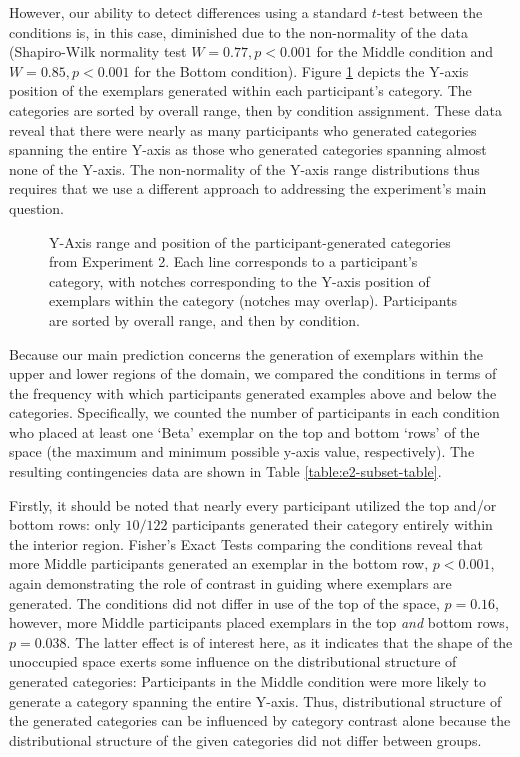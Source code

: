 \documentclass[12pt]{article}
\newcommand\inputpgf[2]{{
\let\pgfimageWithoutPath\pgfimage
\renewcommand{\pgfimage}[2][]{\pgfimageWithoutPath[##1]{#1/##2}}

}}
\begin{document}
\begin{flushleft}
However, our ability to detect differences using a standard $t$-test between the conditions is, in this case, diminished due to the non-normality of the data (Shapiro-Wilk normality test $W=0.77, p< 0.001$ for the Middle condition and $W=0.85, p < 0.001$ for the Bottom condition). Figure \ref{fig:e2-yranges} depicts the Y-axis position of the exemplars generated within each participant's category. The categories are sorted by overall range, then by condition assignment. These data reveal that there were nearly as many participants who generated categories spanning the entire Y-axis as those who generated categories spanning almost none of the Y-axis. The non-normality of the Y-axis range distributions thus requires that we use a different approach to addressing the experiment's main question.

\begin{figure}
    \begin{center}
    \inputpgf{figs/}{e2-yranges.pgf}
    \caption{Y-Axis range and position of the participant-generated categories from Experiment 2. Each line corresponds to a participant's category, with notches corresponding to the Y-axis position of exemplars within the category (notches may overlap). Participants are sorted by overall range, and then by condition. }
    \label{fig:e2-yranges}
    \end{center}
\end{figure}

Because our main prediction concerns the generation of exemplars within the upper and lower regions of the domain, we compared the conditions in terms of the frequency with which participants generated examples above and below the categories. Specifically, we counted the number of participants in each condition who placed at least one `Beta' exemplar on the top and bottom `rows' of the space (the maximum and minimum possible y-axis value, respectively). The resulting contingencies data are shown in Table \ref{table:e2-subset-table}. 

Firstly, it should be noted that nearly every participant utilized the top and/or bottom rows: only $10 / 122$ participants generated their category entirely within the interior region. Fisher's Exact Tests comparing the conditions reveal that more Middle participants generated an exemplar in the bottom row, $p < 0.001$, again demonstrating the role of contrast in guiding where exemplars are generated. The conditions did not differ in use of the top of the space, $p = 0.16$, however, more Middle participants placed exemplars in the top {\em and} bottom rows, $p = 0.038$. The latter effect is of interest here, as it indicates that the shape of the unoccupied space exerts some influence on the distributional structure of generated categories: Participants in the Middle condition were more likely to generate a category spanning the entire Y-axis. Thus, distributional structure of the generated categories can be influenced by category contrast alone because the distributional structure of the given categories did not differ between groups.


\end{flushleft}
\end{document}
